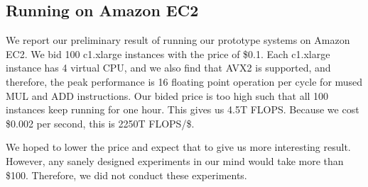 \documentclass[11pt]{article}
\begin{document}
\subsection{Running on Amazon EC2}

We report our preliminary result of running our prototype
systems on Amazon EC2. We bid 100 c1.xlarge instances with 
the price of \$0.1. Each c1.xlarge instance has
4 virtual CPU, and we also find that AVX2 is supported, and
therefore, the peak performance is 16 floating point
operation per cycle for mused MUL and ADD instructions.
Our bided price is too high such that all 100 instances
keep running for one hour. This gives us 4.5T FLOPS.
Because we cost \$0.002 per second, this is 2250T FLOPS/\$.

We hoped to lower the price and expect that to give us
more interesting result. However, any sanely designed
experiments in our mind would take more than \$100. Therefore,
we did not conduct these experiments.



\end{document}
